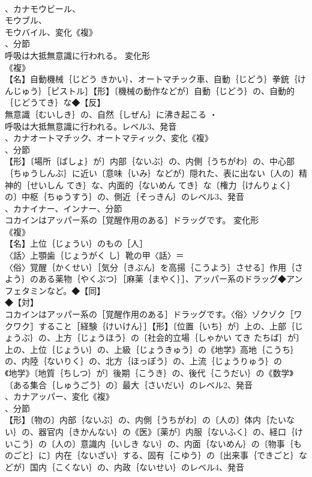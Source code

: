 \documentclass[8pt]{extreport}
\begin{document}
\begin{CJK}{UTF8}{min}
\\	、カナモウビール、
\\	モウブル、
\\	モウバイル、変化《複》
\\	、分節
\\	呼吸は大抵無意識に行われる。	変化形 
\\	《複》
\\	【名】自動機械｛じどう きかい｝、オートマチック車、自動｛じどう｝拳銃｛けんじゅう｝［ピストル］【形】〔機械の動作などが〕自動｛じどう｝の、自動的｛じどうてき｝な◆【反】
\\	無意識｛むいしき｝の、自然｛しぜん｝に沸き起こる ・
\\	呼吸は大抵無意識に行われる。レベル3、発音
\\	、カナオートマチック、オートマティック、変化《複》
\\	、分節
\\	【形】〔場所｛ばしょ｝が〕内部｛ないぶ｝の、内側｛うちがわ｝の、中心部｛ちゅうしんぶ｝に近い〔意味｛いみ｝などが〕隠れた、表に出ない〔人の〕精神的｛せいしん てき｝な、内面的｛ないめん てき｝な〔権力｛けんりょく｝の〕中枢｛ちゅうすう｝の、側近｛そっきん｝のレベル3、発音
\\	、カナイナー、インナー、分節
\\	コカインはアッパー系の［覚醒作用のある］ドラッグです。	変化形 
\\	《複》
\\	【名】上位｛じょうい｝のもの［人］
\\	〈話〉上顎歯｛じょうがく し｝靴の甲〈話〉＝
\\	〈俗〉覚醒｛かくせい｝［気分｛きぶん｝を高揚｛こうよう｝させる］作用｛さよう｝のある薬物｛やくぶつ｝［麻薬｛まやく｝］、アッパー系のドラッグ◆アンフェタミンなど。◆【同】
\\	◆【対】
\\	コカインはアッパー系の［覚醒作用のある］ドラッグです。〈俗〉ゾクゾク［ワクワク］すること［経験｛けいけん｝］【形】〔位置｛いち｝が〕上の、上部｛じょうぶ｝の、上方｛じょうほう｝の〔社会的立場｛しゃかい てき たちば｝が〕上の、上位｛じょうい｝の、上級｛じょうきゅう｝の《地学》高地｛こうち｝の、内陸｛ないりく｝の、北方｛ほっぽう｝の、上流｛じょうりゅう｝の
\\	《地学》〔地質｛ちしつ｝が〕後期｛こうき｝の、後代｛こうだい｝の《数学》〔ある集合｛しゅうごう｝の〕最大｛さいだい｝のレベル2、発音
\\	、カナアッパー、変化《複》
\\	、分節
\\	【形】〔物の〕内部｛ないぶ｝の、内側｛うちがわ｝の〔人の〕体内｛たいない｝の、器官内｛きかんない｝の《医》〔薬が〕内服｛ないふく｝の、経口｛けいこう｝の〔人の〕意識内｛いしき ない｝の、内面｛ないめん｝の〔物事｛ものごと｝に〕内在｛ないざい｝する、固有｛こゆう｝の〔出来事｛できごと｝などが〕国内｛こくない｝の、内政｛ないせい｝のレベル4、発音

\end{CJK}
\end{document}
